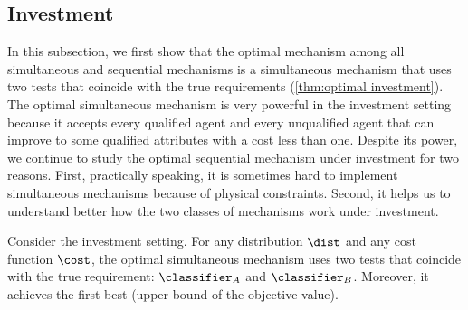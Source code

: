 \subsection{Investment}\label{sec:optimal investment}
In this subsection, we first show that the optimal mechanism among all simultaneous and sequential mechanisms is a simultaneous mechanism that uses two tests that coincide with the true requirements (\cref{thm:optimal investment}). 
The optimal simultaneous mechanism is very powerful in the investment setting because it accepts every qualified agent and every unqualified agent that can improve to some qualified attributes with a cost less than one.
Despite its power, we continue to study the optimal sequential mechanism under investment for two reasons.
First, practically speaking, it is sometimes hard to implement simultaneous mechanisms because of physical constraints.
Second, it helps us to understand better how the two classes of mechanisms work under investment.



\begin{proposition}\label{thm:optimal investment}
    Consider  the investment setting.  
    For any distribution $\dist$ and any cost function $\cost$, the optimal simultaneous  mechanism uses two tests that coincide with the true requirement: $\classifier_A$ and $\classifier_B$. Moreover, it achieves the first best (upper bound of the objective value).
\end{proposition}

